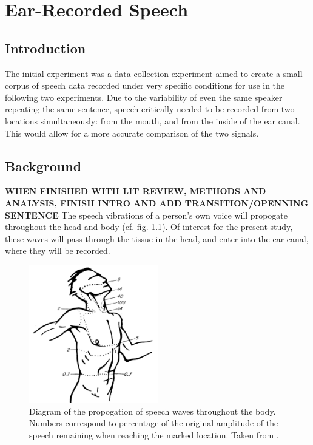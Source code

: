 \documentclass[dissertation,copyright]{uathesis}
\begin{document}




 





\chapter{Ear-Recorded Speech\label{chapter2}}


\section{Introduction}

The initial experiment was a data collection experiment aimed to create a small corpus of speech data recorded under very specific conditions for use in the following two experiments.  Due to the variability of even the same speaker repeating the same sentence, speech critically needed to be recorded from two locations simultaneously: from the mouth, and from the inside of the ear canal.  This would allow for a more accurate comparison of the two signals.

\section{Background}

\textbf{WHEN FINISHED WITH LIT REVIEW, METHODS AND ANALYSIS, FINISH INTRO AND ADD TRANSITION/OPENNING SENTENCE}
The speech vibrations of a person's own voice will propogate throughout the head and body (cf. fig. \ref{fig:bekesyBodyTransfer}).  Of interest for the present study, these waves will pass through the tissue in the head, and enter into the ear canal, where they will be recorded.

\begin{figure}
\centering
  \includegraphics[width=0.5\textwidth]{figure/bekesy60-3b.png}
  \caption{Diagram of the propogation of speech waves throughout the body. Numbers correspond to percentage of the original amplitude of the speech remaining when reaching the marked location. Taken from \cite{bekesy:60}.}
  \label{fig:bekesyBodyTransfer}
\end{figure}
\end{document}
